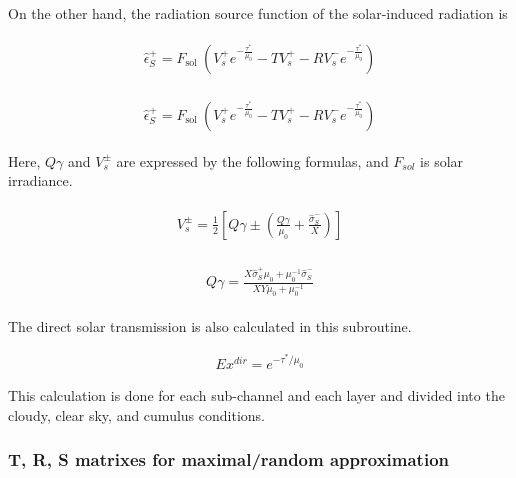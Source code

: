 On the other hand, the radiation source function of the solar-induced
radiation is

\begin{eqnarray}
\begin{array}{l}
\hat{\epsilon}_{S}^{+}=F_{\text {sol }}\left(V_{s}^{+} e^{-\frac{\tau^{*}}{\mu_{0}}}-T V_{s}^{+}-R V_{s}^{-} e^{-\frac{\tau^{*}}{\mu_{0}}}\right)
\end{array}
\end{eqnarray}

\begin{eqnarray}
\begin{array}{l}
\hat{\epsilon}_{S}^{+}=F_{\text {sol }}\left(V_{s}^{+} e^{-\frac{\tau^{*}}{\mu_{0}}}-T V_{s}^{+}-R V_{s}^{-} e^{-\frac{\tau^{*}}{\mu_{0}}}\right)
\end{array}
\end{eqnarray}

Here, \(Q \gamma\) and \(V_{s}^{\pm}\) are expressed by the following
formulas, and \(F_{sol}\) is solar irradiance.

\begin{eqnarray}
\begin{array}{c}
V_{s}^{\pm}=\frac{1}{2}\left[Q \gamma \pm\left(\frac{Q \gamma}{\mu_{0}}+\frac{\hat{\sigma}_{S}^{-}}{X}\right)\right]
\end{array}
\end{eqnarray}

\begin{eqnarray}
\begin{array}{c}
Q \gamma=\frac{X \hat{\sigma}_{S}^{+} \mu_{0}+\mu_{0}^{-1} \hat{\sigma}_{S}^{-}}{X Y \mu_{0}+\mu_{0}^{-1}}
\end{array}
\end{eqnarray}

The direct solar transmission is also calculated in this subroutine.

\begin{eqnarray}
E x^{d i r}=e^{-\tau^{*}/ \mu_{0}}
\end{eqnarray}

This calculation is done for each sub-channel and each layer and divided
into the cloudy, clear sky, and cumulus conditions.

\hypertarget{t-r-s-matrixes-for-maximalrandom-approximation}{%
\subsubsection{T, R, S matrixes for maximal/random
approximation}\label{t-r-s-matrixes-for-maximalrandom-approximation}}

